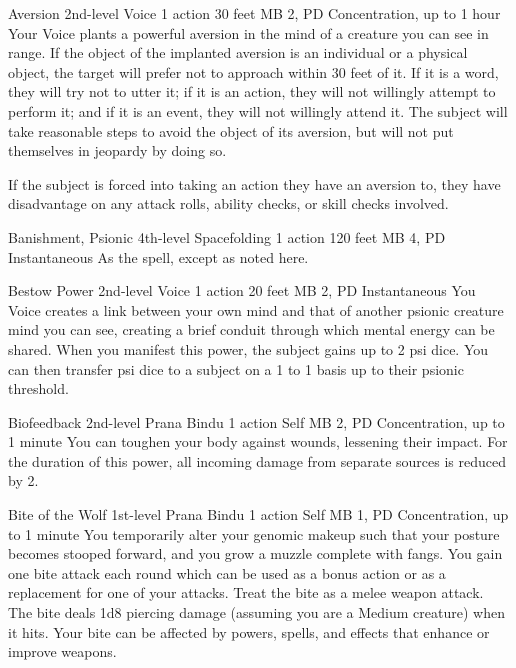 \DndPowerHeader%
  {Aversion}
  {2nd-level Voice}
  {1 action}
  {30 feet}
  {MB 2, PD \lvltwo}
  {Concentration, up to 1 hour}
Your Voice plants a powerful aversion in the mind of
a creature you can see in range.
If the object of the implanted aversion is an individual
or a physical object,
the target will prefer not to approach within 30 feet of it.
If it is a word,
they will try not to utter it;
if it is an action,
they will not willingly attempt to perform it;
and if it is an event,
they will not willingly attend it.
The subject will take reasonable steps to avoid the object of its aversion,
but will not put themselves in jeopardy by doing so.

If the subject is forced into taking an action they have an aversion to,
they have disadvantage on any attack rolls,
ability checks,
or skill checks involved.

\DndPowerHeader%
  {Banishment, Psionic}
  {4th-level Spacefolding}
  {1 action}
  {120 feet}
  {MB 4, PD \lvlfour}
  {Instantaneous}
As the  spell, except as noted here.

\DndPowerHeader%
  {Bestow Power}
  {2nd-level Voice}
  {1 action}
  {20 feet}
  {MB 2, PD \lvltwo}
  {Instantaneous}
You Voice creates a link between your own mind
and that of another psionic creature mind you can see,
creating a brief conduit
through which mental energy can be shared.
When you manifest this power,
the subject gains up to 2 psi dice.
You can then transfer psi dice to a subject
on a 1 to 1 basis up to their psionic threshold.

\DndPowerHeader%
  {Biofeedback}
  {2nd-level Prana Bindu}
  {1 action}
  {Self}
  {MB 2, PD \lvltwo}
  {Concentration, up to 1 minute}
  You can toughen your body against wounds,
  lessening their impact.
  For the duration of this power, all incoming damage
  from separate sources is reduced by 2.

\DndPowerHeader%
  {Bite of the Wolf}
  {1st-level Prana Bindu}
  {1 action}
  {Self}
  {MB 1, PD \lvlone}
  {Concentration, up to 1 minute}
You temporarily alter your genomic makeup
such that your posture becomes stooped forward,
and you grow a muzzle complete with fangs.
You gain one bite attack each round which
can be used as a bonus action or as a replacement
for one of your attacks.
Treat the bite as a melee weapon attack.
The bite deals 1d8 piercing damage
(assuming you are a Medium creature)
when it hits.
Your bite can be affected by
powers, spells, and effects
that enhance or improve weapons.

